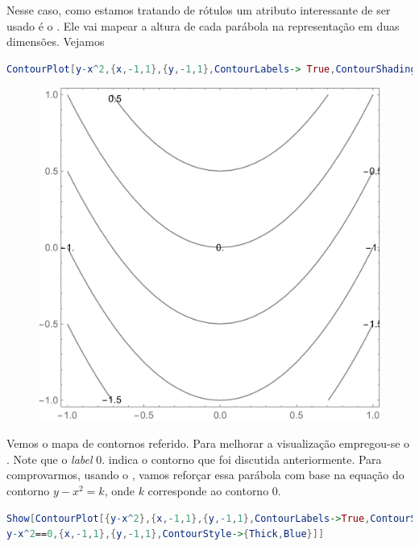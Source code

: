 \documentclass[a4paper, 12pt]{article}
\begin{document}
	Nesse caso, como estamos tratando de rótulos um atributo interessante de ser usado é o . Ele vai mapear a altura de cada parábola na representação em duas dimensões. Vejamos

\begin{lstlisting}[language=Mathematica]
ContourPlot[y-x^2,{x,-1,1},{y,-1,1},ContourLabels-> True,ContourShading->False]
\end{lstlisting}

	\newpage
	\begin{figure}[!h]
		\centering
		\includegraphics[scale=.47]{images/ContourLabels}
	\end{figure}

	Vemos o mapa de contornos referido. Para melhorar a visualização empregou-se o . Note que o \textit{label} 0. indica o contorno que foi discutida anteriormente. Para comprovarmos, usando o , vamos reforçar essa parábola com base na equação do contorno $y-x^{2}=k$, onde $k$ corresponde ao contorno 0.
	
\begin{lstlisting}[language=Mathematica]
Show[ContourPlot[{y-x^2},{x,-1,1},{y,-1,1},ContourLabels->True,ContourShading->False,GridLines->Automatic],ContourPlot[
y-x^2==0,{x,-1,1},{y,-1,1},ContourStyle->{Thick,Blue}]]
\end{lstlisting}
\end{document}
